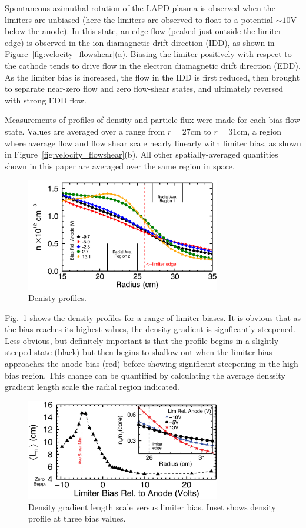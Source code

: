 \documentclass[aip,pop,amsmath,amssymb,preprint,superscriptaddress]{revtex4-1} %
\begin{document}
Spontaneous azimuthal rotation of the LAPD plasma is observed when the limiters are
unbiased (here the limiters are observed to float to a
potential $\sim 10$V below the anode).  In this state, an edge flow
(peaked just outside the limiter edge) is
observed in the ion diamagnetic drift direction (IDD), as shown in
Figure~\ref{fig:velocity_flowshear}(a).  Biasing the limiter positively
with respect to the cathode tends to drive flow in the electron
diamagnetic drift direction (EDD).  As the limiter bias is increased, the
flow in the IDD is first reduced, then brought to separate near-zero flow
and zero flow-shear states, and ultimately reversed with strong EDD flow.

Measurements of profiles of density and particle flux
were made for each bias flow state. Values are averaged over a range
from $r=27$cm to $r=31$cm, a region where average flow and flow shear scale
nearly linearly with limiter bias, as shown in
Figure~\ref{fig:velocity_flowshear}(b).  All other spatially-averaged
quantities shown in this paper are averaged over the same region in space.

\begin{figure}[!htbp]
\centerline{
\includegraphics[width=8.5cm]{densprof}}
\caption{\label{fig:densprof} Denisty profiles.}
\end{figure}

Fig.~\ref{fig:densprof} shows the density profiles for a range of limiter biases. It is obvious that as the bias reaches its highest values, the density gradient is signficantly steepened. Less obvious, but definitely important is that the profile begins in a slightly steeped state (black) but then begins to shallow out when the limiter bias approaches the anode bias (red) before showing significant steepening in the high bias region. This change can be quantified by calculating the average denssity gradient length scale the radial region indicated.

\begin{figure}[!htbp]
\centerline{
\includegraphics[width=8.5cm]{figure2.eps}}
\caption{\label{fig:densgrad} Density gradient length scale versus limiter bias. Inset shows density profile at three bias values.}
\end{figure}
\end{document}
